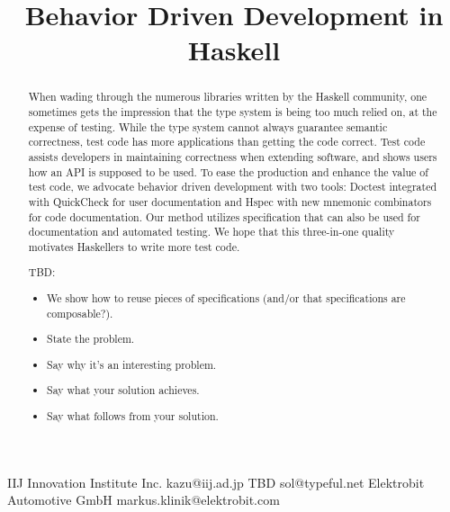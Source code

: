 \documentclass[preprint]{sigplanconf}
\begin{document}
\copyrightdata{[to be supplied]}


\title{Behavior Driven Development in Haskell}

           {IIJ Innovation Institute Inc.}
           {kazu@iij.ad.jp}
           {TBD}
           {sol@typeful.net}
           {Elektrobit Automotive GmbH}
           {markus.klinik@elektrobit.com}

\maketitle

\begin{abstract}

When wading through the numerous libraries written by
the Haskell community, one sometimes gets the impression that the type
system is being too much relied on, at the expense of testing.
While the type system cannot always guarantee semantic correctness,
test code has more applications than getting the code correct.
Test code assists developers in maintaining correctness when extending
software, and shows users how an API is supposed to be used.
To ease the production and enhance the value of test code, we advocate
behavior driven development with two tools:
Doctest integrated with QuickCheck for user documentation and
Hspec with new mnemonic combinators for code documentation.
Our method utilizes specification that can also be used for
documentation and automated testing. We hope that this three-in-one
quality motivates Haskellers to write more test code.

TBD:

\begin{itemize}
    \item We show how to reuse pieces of specifications (and/or that
        specifications are composable?).
\end{itemize}

\begin{itemize}
    \item State the problem.
    \item Say why it's an interesting problem.
    \item Say what your solution achieves.
    \item Say what follows from your solution.
\end{itemize}

\end{abstract}
\end{document}
